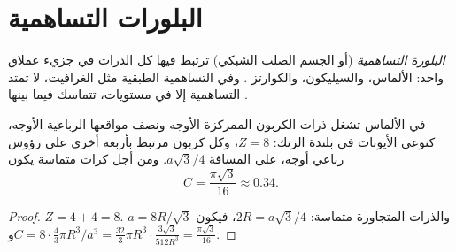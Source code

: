 \section{البلورات التساهمية}

\begin{definition}\label{def:b1:crystals-ionic-covalent:covalent-crystal}
\emph{البلورة التساهمية} (أو الجسم الصلب الشبكي)
 ترتبط فيها كل الذرات  في جزيء
عملاق واحد: الألماس، والسيليكون، والكوارتز . وفي  التساهمية
الطبقية مثل الغرافيت، لا تمتد  التساهمية إلا في
مستويات، تتماسك فيما بينها .
\end{definition}

\begin{proposition}\label{prop:b1:crystals-ionic-covalent:diamond}
في الألماس تشغل ذرات الكربون  الممركزة الأوجه ونصف
مواقعها الرباعية الأوجه، كنوعي الأيونات في بلندة الزنك: $Z = 8$، وكل
كربون مرتبط بأربعة أخرى على رؤوس رباعي أوجه، على
المسافة $a\sqrt3/4$. ومن أجل كرات متماسة يكون 
\[
  C = \frac{\pi\sqrt3}{16} \approx 0.34 .
\]
\end{proposition}

\begin{proof}
$Z = 4 + 4 = 8$. والذرات المتجاورة متماسة: $2R = a\sqrt3/4$، فيكون $a =
8R/\sqrt3$ و$C = 8 \cdot \frac43\pi R^3/a^3 = \frac{32}{3}\pi R^3 \cdot
\frac{3\sqrt3}{512 R^3} = \frac{\pi\sqrt3}{16}$.
\end{proof}

